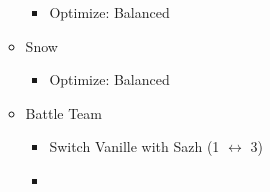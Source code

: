 \begin{menu}
\begin{itemize}
\begin{itemize}
\begin{itemize}
					      \item Optimize: Balanced
				      \end{itemize}
				\item Snow
				      \begin{itemize}
					      \item Optimize: Balanced
				      \end{itemize}
			\end{itemize}
			\paradigm
			\begin{itemize}
				\item Battle Team
				      \begin{itemize}
					      \item Switch Vanille with Sazh (1 $\leftrightarrow$ 3)
					      \item {}%
					            {\paradigmline{\com}{\com}{\med}}%
					            {\paradigmline[2]{\textit{\com}}{\textit{\com}}{\textit{(\rav)}}}%
					            {\paradigmline{(\sen)}{\sen}{(\med)}}%
					            {\paradigmline{\syn}{\rav}{\rav}}%
					            {\paradigmline{\rav}{\rav}{\sab}}%
					            {\paradigmline{\rav}{\rav}{\rav}}
				      \end{itemize}
			\end{itemize}
		\end{itemize}
	\end{menu}
	\vfill
	\renewcommand{\first}{[1] Tireless Charge ((\com)/\com/\med)}
	\renewcommand{\second}{[2] Aggression (\com/\com/\rav)}
	\renewcommand{\third}{[3] Consolidation (\sen/\sen/\med)}
	\renewcommand{\fourth}{[4] Malevolence (\syn/(\rav)/\rav)}
	\renewcommand{\fifth}{[5] Smart Bomb (\rav/\rav/\sab)}
	\renewcommand{\sixth}{[6] Tri-Disaster (\rav/\rav/\rav)}

